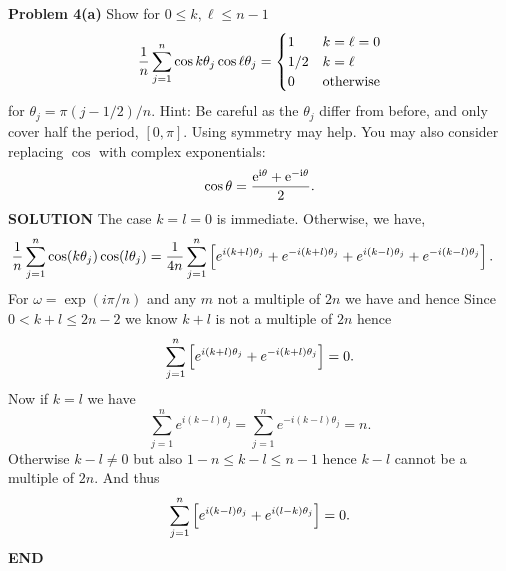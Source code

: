 \documentclass[12pt,a4paper]{article}
\begin{document}
\textbf{Problem 4(a)} Show for $0 \ensuremath{\leq} k,\ensuremath{\ell} \ensuremath{\leq} n-1$
\[
{1 \over n} \ensuremath{\sum}_{j=1}^n \cos k \ensuremath{\theta}_j \cos \ensuremath{\ell} \ensuremath{\theta}_j = \begin{cases} 1 & k = \ensuremath{\ell} = 0 \\
                                                  1/2 & k = \ensuremath{\ell} \\
                                                  0 & \hbox{otherwise}
                                                  \end{cases}
\]
for $\ensuremath{\theta}_j = \ensuremath{\pi}(j-1/2)/n$. Hint: Be careful as the $\ensuremath{\theta}_j$ differ from before, and only cover half the period, $[0,\ensuremath{\pi}]$. Using symmetry may help. You may also consider replacing $\cos$ with complex exponentials:
\[
\cos \ensuremath{\theta} = {{\rm e}^{{\rm i}\ensuremath{\theta}} + {\rm e}^{-{\rm i}\ensuremath{\theta}} \over 2}.
\]
\textbf{SOLUTION} The case $k = l = 0$ is immediate. Otherwise, we have,
\begin{align*}
\frac{1}{n}\ensuremath{\sum}_{j=1}^n \cos(k\ensuremath{\theta}_j)\cos(l\ensuremath{\theta}_j) &= {1 \over 4n}\ensuremath{\sum}_{j=1}^n \br[e^{i(k+l)\ensuremath{\theta}_j} + e^{-i(k+l)\ensuremath{\theta}_j} + e^{i(k-l)\ensuremath{\theta}_j} + e^{-i(k-l)\ensuremath{\theta}_j}].
\end{align*}
For $\ensuremath{\omega} = \exp(i \ensuremath{\pi}/n)$ and any $m$ not a multiple of $2n$ we have
and hence
Since $0 < k+l \ensuremath{\leq} 2n-2$ we know $k+l$ is not a multiple of $2n$ hence
\[
\ensuremath{\sum}_{j=1}^n \br[e^{i(k+l)\ensuremath{\theta}_j} + e^{-i(k+l)\ensuremath{\theta}_j}] = 0.
\]
Now if $k = l$ we have
\[
\ensuremath{\sum}_{j=1}^n e^{i(k-l)\ensuremath{\theta}_j} = \ensuremath{\sum}_{j=1}^n e^{-i(k-l)\ensuremath{\theta}_j} = n.
\]
Otherwise $k-l \ensuremath{\neq} 0$ but also $1-n \ensuremath{\leq} k-l \ensuremath{\leq} n-1$ hence $k-l$ cannot be a multiple of $2n$. And thus
\[
\ensuremath{\sum}_{j=1}^n \br[e^{i(k-l)\ensuremath{\theta}_j} + e^{i(l-k)\ensuremath{\theta}_j}] = 0.
\]
\textbf{END}
\end{document}
